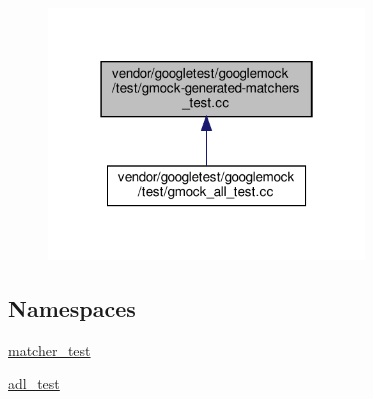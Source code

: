 \begin{figure}[H]
\begin{center}
\leavevmode
\includegraphics[width=238pt]{gmock-generated-matchers__test_8cc__dep__incl}
\end{center}
\end{figure}
\subsection*{Namespaces}
\begin{DoxyCompactItemize}
\item 
 \hyperlink{namespacematcher__test}{matcher\+\_\+test}
\item 
 \hyperlink{namespaceadl__test}{adl\+\_\+test}
\end{DoxyCompactItemize}
